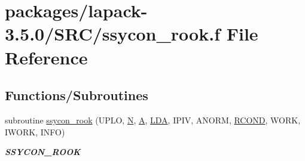 \hypertarget{ssycon__rook_8f}{}\section{packages/lapack-\/3.5.0/\+S\+R\+C/ssycon\+\_\+rook.f File Reference}
\label{ssycon__rook_8f}
\subsection*{Functions/\+Subroutines}
\begin{DoxyCompactItemize}
\item 
subroutine \hyperlink{group__realSYcomputational_ga7fcaab2596faf934aacea4f34f8dd857}{ssycon\+\_\+rook} (U\+P\+L\+O, \hyperlink{polmisc_8c_a0240ac851181b84ac374872dc5434ee4}{N}, \hyperlink{classA}{A}, \hyperlink{example__user_8c_ae946da542ce0db94dced19b2ecefd1aa}{L\+D\+A}, I\+P\+I\+V, A\+N\+O\+R\+M, \hyperlink{superlu__enum__consts_8h_af00a42ecad444bbda75cde1b64bd7e72a9b5c151728d8512307565994c89919d5}{R\+C\+O\+N\+D}, W\+O\+R\+K, I\+W\+O\+R\+K, I\+N\+F\+O)
\begin{DoxyCompactList}\small\item\em {\bfseries S\+S\+Y\+C\+O\+N\+\_\+\+R\+O\+O\+K} \end{DoxyCompactList}\end{DoxyCompactItemize}
